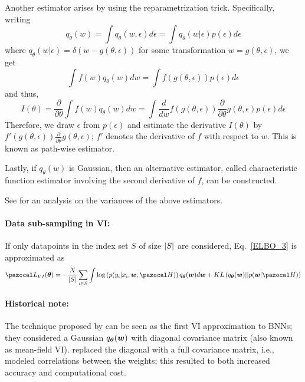 Another estimator arises by using the reparametrization trick. 
Specifically, writing
\begin{equation}
q_{\theta}(w)=
\int  q_{\theta}(w, \epsilon)d\epsilon = \int  q_{\theta}(w| \epsilon)p(\epsilon)d\epsilon
\end{equation}
where $q_{\theta}(w| \epsilon) = \delta(w-g(\theta,\epsilon))$ for some transformation $w = g(\theta,\epsilon)$, we get
\begin{equation}
\int f(w)q_{\theta}(w)dw = \int f(g(\theta,\epsilon))p(\epsilon)d\epsilon 
\end{equation}
and thus,
\begin{equation}
I(\theta) = \frac{\partial}{\partial \theta} \int f(w)q_{\theta}(w)dw=
\int \frac{d}{dw}f(g(\theta,\epsilon)) \frac{\partial}{\partial \theta}g(\theta,\epsilon)p(\epsilon)d\epsilon 
\end{equation}
Therefore, we draw $\epsilon$ from $p(\epsilon)$ and estimate the derivative $I(\theta)$ by $f'(g(\theta,\epsilon)) \frac{\partial}{\partial \theta}g(\theta,\epsilon)$; $f'$ denotes the derivative of $f$ with respect to $w$.
This is known as path-wise estimator.

Lastly, if $q_{\theta}(w)$ is Gaussian, then an alternative estimator, called characteristic function estimator involving the second derivative of $f$, can be constructed. 

See \textcite{gal2016uncertainty} for an analysis on the variances of the above estimators. 

\paragraph{Data sub-sampling in VI:}\label{sec:stochastic:VI}
If only datapoints in the index set $S$ of size $\abs{S}$ are considered, Eq.~\eqref{ELBO_3} is approximated as
\begin{equation}\label{ELBO_4}
\cL_{VI}(\bth) = -\frac{N}{\abs{S}}\sum_{i\in S}^{}\int \log\left(p(y_i|x_i,\bw,\cH)\right)q_{\bth}(\bw) d\bw + KL\left(q_{\bth}(\bw)||p(\bw|\cH)\right)
\end{equation}

\paragraph{Historical note:}
The technique proposed by \textcite{hinton1993keeping} can be seen as the first VI approximation to BNNs; they considered a Gaussian $q_{\boldsymbol{\theta}}(\boldsymbol{w})$ with diagonal covariance matrix (also known as mean-field VI). 
\textcite{barber1998ensemble} replaced the diagonal with a full covariance matrix, i.e., modeled correlations between the weights; this resulted to both increased accuracy and computational cost. 

